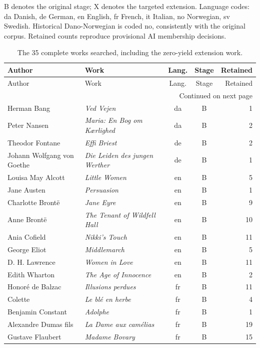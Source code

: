 B denotes the original stage; X denotes the targeted extension. Language codes: da Danish, de German, en English, fr French, it Italian, no Norwegian, sv Swedish. Historical Dano-Norwegian is coded no, consistently with the original corpus. Retained counts reproduce provisional AI membership decisions.

\begingroup\small
\setlength{\tabcolsep}{3pt}
\begin{longtable}{@{}p{34mm}p{71mm}ccr@{}}
\caption{The 35 complete works searched, including the zero-yield extension work.}\\
\toprule
Author & Work & Lang. & Stage & Retained \\
\midrule\endfirsthead
\toprule
Author & Work & Lang. & Stage & Retained \\
\midrule\endhead
\midrule\multicolumn{5}{r}{Continued on next page}\\\endfoot
\bottomrule\endlastfoot
Herman Bang & \emph{Ved Vejen} & da & B & 1 \\
Peter Nansen & \emph{Maria: En Bog om Kærlighed} & da & B & 2 \\
Theodor Fontane & \emph{Effi Briest} & de & B & 2 \\
Johann Wolfgang von Goethe & \emph{Die Leiden des jungen Werther} & de & B & 1 \\
Louisa May Alcott & \emph{Little Women} & en & B & 5 \\
Jane Austen & \emph{Persuasion} & en & B & 1 \\
Charlotte Brontë & \emph{Jane Eyre} & en & B & 9 \\
Anne Brontë & \emph{The Tenant of Wildfell Hall} & en & B & 10 \\
Ania Cofield & \emph{Nikki's Touch} & en & B & 11 \\
George Eliot & \emph{Middlemarch} & en & B & 5 \\
D. H. Lawrence & \emph{Women in Love} & en & B & 11 \\
Edith Wharton & \emph{The Age of Innocence} & en & B & 2 \\
Honoré de Balzac & \emph{Illusions perdues} & fr & B & 11 \\
Colette & \emph{Le blé en herbe} & fr & B & 4 \\
Benjamin Constant & \emph{Adolphe} & fr & B & 1 \\
Alexandre Dumas fils & \emph{La Dame aux camélias} & fr & B & 19 \\
Gustave Flaubert & \emph{Madame Bovary} & fr & B & 15 \\

\end{longtable}
